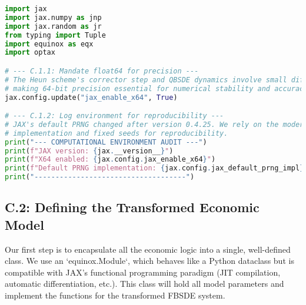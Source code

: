 \begin{lstlisting}[language=Python, caption={C.1: Reproducibility and Precision Audit.}, label={lst:audit_app_appendix}]
import jax
import jax.numpy as jnp
import jax.random as jr
from typing import Tuple
import equinox as eqx
import optax

# --- C.1.1: Mandate float64 for precision ---
# The Heun scheme's corrector step and QBSDE dynamics involve small differences,
# making 64-bit precision essential for numerical stability and accuracy.
jax.config.update("jax_enable_x64", True)

# --- C.1.2: Log environment for reproducibility ---
# JAX's default PRNG changed after version 0.4.25. We rely on the modern 'threefry'
# implementation and fixed seeds for reproducibility.
print("--- COMPUTATIONAL ENVIRONMENT AUDIT ---")
print(f"JAX version: {jax.__version__}")
print(f"X64 enabled: {jax.config.jax_enable_x64}")
print(f"Default PRNG implementation: {jax.config.jax_default_prng_impl}")
print("------------------------------------")
\end{lstlisting}

\subsection{C.2: Defining the Transformed Economic Model}
Our first step is to encapsulate all the economic logic into a single, well-defined class. We use an `equinox.Module`, which behaves like a Python dataclass but is compatible with JAX's functional programming paradigm (JIT compilation, automatic differentiation, etc.). This class will hold all model parameters and implement the functions for the transformed FBSDE system.

